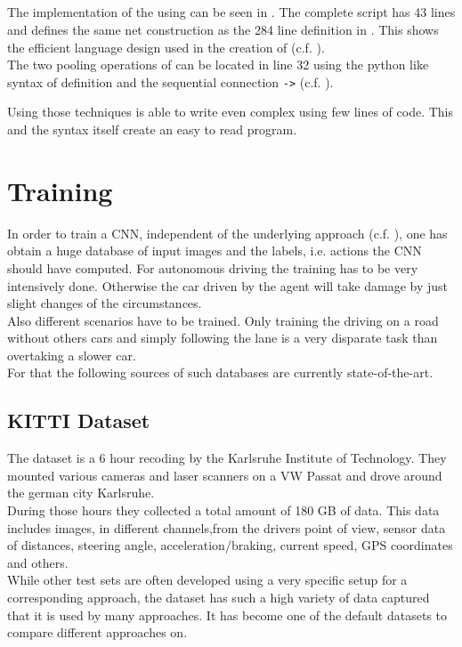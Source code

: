 \subsection{\cnnarch} \label{subsec: CNNArch Implementation}

The implementation of the \alexnet using \cnnarch can be seen in . The complete script has 43 lines and defines the same net construction as the 284 line definition in \caffe. This shows the efficient language design used in the creation of \cnnarch (c.f. ). \\
The two pooling operations of  can be located in line 32 using the python like syntax of definition and the sequential connection \texttt{->} (c.f. ).

Using those techniques \cnnarch is able to write even complex \nn using few lines of code. This and the syntax itself create an easy to read program.

\section{Training}

In order to train a CNN, independent of the underlying approach (c.f. ), one has obtain a huge database of input images and the labels, i.e. actions the CNN should have computed. For autonomous driving the training has to be very intensively done. Otherwise the car driven by the agent will take damage by just slight changes of the circumstances.\\
Also different scenarios have to be trained. Only training the driving on a road without others cars and simply following the lane is a very disparate task than overtaking a slower car.\\
For that the following sources of such databases are currently state-of-the-art.

\subsection{KITTI Dataset} \label{subsec: KITTI}

The \kitti dataset is a 6 hour recoding by the Karlsruhe Institute of Technology. They mounted various cameras and laser scanners on a VW Passat and drove around the german city Karlsruhe.\\
During those hours they collected a total amount of 180 GB of data. This data includes images, in different channels,from the drivers point of view, sensor data of distances, steering angle, acceleration/braking, current speed, GPS coordinates and others. \\
While other test sets are often developed using a very specific setup for a corresponding approach, the \kitti dataset has such a high variety of data captured that it is used by many approaches. It has become one of the default datasets to compare different approaches on. \cite{KITTI}

